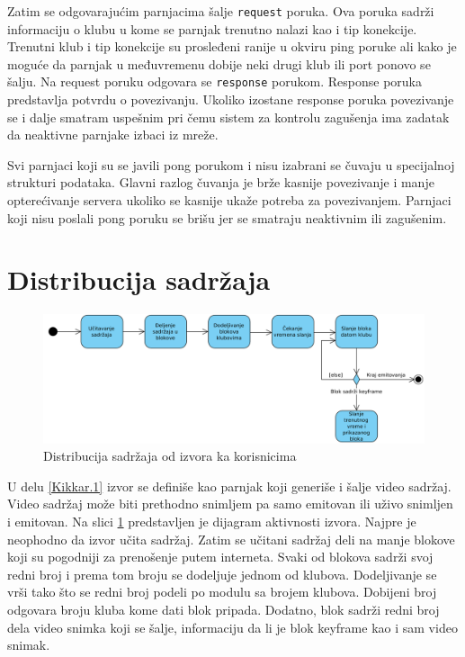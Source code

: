 \documentclass[12pt,oneside]{memoir}
\begin{document}
Zatim se odgovarajućim parnjacima šalje \texttt{request} poruka. Ova poruka sadrži informaciju o klubu u kome se parnjak trenutno nalazi kao i tip konekcije. Trenutni klub i tip konekcije su prosleđeni ranije u okviru ping poruke ali kako je moguće da parnjak u međuvremenu dobije neki drugi klub ili port ponovo se šalju. Na request poruku odgovara se \texttt{response} porukom. Response poruka predstavlja potvrdu o povezivanju. Ukoliko izostane response poruka povezivanje se i dalje smatram uspešnim pri čemu sistem za kontrolu zagušenja ima zadatak da neaktivne parnjake izbaci iz mreže. 

Svi parnjaci koji su se javili pong porukom i nisu izabrani se čuvaju u specijalnoj strukturi podataka. Glavni razlog čuvanja je brže kasnije povezivanje i manje opterećivanje servera ukoliko se kasnije ukaže potreba za povezivanjem. Parnjaci koji nisu poslali pong poruku se brišu jer se smatraju neaktivnim ili zagušenim.  


\section{Distribucija sadržaja}
\label{Kikkar.3}

\begin{figure}[!ht]
  \centering
  \includegraphics[width=1.05\textwidth]{slike/distribucija-izvor.jpg}
  \caption{Distribucija sadržaja od izvora ka korisnicima}
  \label{fig:distribucija-izvor}
\end{figure}
\par


U delu \ref{Kikkar.1} izvor se definiše kao parnjak koji generiše i šalje video sadržaj. Video sadržaj može biti prethodno snimljem pa samo emitovan ili uživo snimljen i emitovan. Na slici \ref{fig:distribucija-izvor} predstavljen je dijagram aktivnosti izvora. Najpre je neophodno da izvor učita sadržaj. Zatim se učitani sadržaj deli na manje blokove koji su pogodniji za prenošenje putem interneta. Svaki od blokova sadrži svoj redni broj i prema tom broju se dodeljuje jednom od klubova. Dodeljivanje se vrši tako što se redni broj podeli po modulu sa brojem klubova. Dobijeni broj odgovara broju kluba kome dati blok pripada. Dodatno, blok sadrži redni broj dela video snimka koji se šalje, informaciju da li je blok keyframe kao i sam video snimak.
\end{document}
